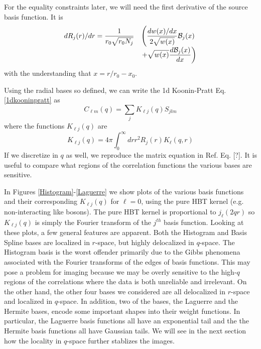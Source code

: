 \documentclass[aps,prl,twocolumn,floatfix,preprintnumbers,showpacs]{revtex4}
\begin{document}
For the equality constraints later, we will need the first derivative of the source basis function.  It is
\begin{equation}\begin{array}{rl}    
    \displaystyle d R_{j}(r)/dr = \frac{1}{ r_{0}\sqrt{ r_{0} N_{j} } } 
    & \displaystyle \left( \frac{ d w(x)/dx }{ 2\sqrt{w(x)} } {\cal B}_{j}(x) \right.\\
    & \displaystyle \left. + \sqrt{w(x)} \frac{d {\cal B}_{j}(x)}{dx} \right)                    
\end{array}\end{equation}    
with the understanding that $x=r/r_{0}-x_{0}$. 

Using the radial bases so defined, we can write the 1d Koonin-Pratt Eq. \eqref{1dkooninpratt} as
\begin{equation}        
C_{\ell m}(q) = \sum_{j} K_{\ell j}(q) S_{jlm}                        
\end{equation}    
where the functions $K_{\ell j}(q)$    are
\begin{equation}        
K_{\ell j}(q) = 4\pi \int_{0}^{\infty} dr r^{2}R_{j}(r) K_{\ell}(q,r)                         
\label{kfunction}                            
\end{equation}    
If we discretize in $q$ as well, we reproduce the matrix equation in Ref. \cite{3dimaging} Eq. [?].            
It is useful to compare what regions of the correlation functions the various bases are sensitive.  

In Figures \ref{Histogram}-\ref{Laguerre} we show plots of the various basis functions and their corresponding $K_{\ell j}(q)$ for $\ell=0$, using the pure HBT kernel (e.g. non-interacting like bosons).  The pure HBT kernel is proportional to $j_{\ell}(2qr)$ so $K_{\ell j}(q)$ is simply the Fourier transform of the $j^{th}$ basis function.  Looking at these plots, a few general features are apparent.  Both the Histogram and Basis Spline bases are localized in $r$-space, but highly delocalized in $q$-space.  The Histogram basis is the worst offender primarily due to the Gibbs phenomena associated with the Fourier transforms of the edges of basis functions.  This may pose a problem for imaging because we may be overly sensitive to the high-$q$ regions of the correlations where the data is both unreliable and irrelevant.  On the other hand, the other four bases we considered are all delocalized in $r$-space and localized in $q$-space.  In addition, two of the bases, the Laguerre and the Hermite bases, encode some important shapes into their weight functions.  In particular, the Laguerre basis functions all have an exponential tail and the the Hermite basis functions all have Gaussian tails.  We will see in the next section how the locality in $q$-space further stablizes the images.
\end{document}
